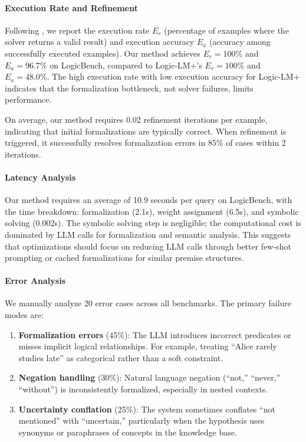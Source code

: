 \paragraph{Execution Rate and Refinement} Following \citet{pan2023logiclm}, we report the execution rate $E_r$ (percentage of examples where the solver returns a valid result) and execution accuracy $E_a$ (accuracy among successfully executed examples). Our method achieves $E_r = 100\%$ and $E_a = 96.7\%$ on LogicBench, compared to Logic-LM+'s $E_r = 100\%$ and $E_a = 48.0\%$. The high execution rate with low execution accuracy for Logic-LM+ indicates that the formalization bottleneck, not solver failures, limits performance.

On average, our method requires 0.02 refinement iterations per example, indicating that initial formalizations are typically correct. When refinement is triggered, it successfully resolves formalization errors in 85\% of cases within 2 iterations.

\paragraph{Latency Analysis} Our method requires an average of 10.9 seconds per query on LogicBench, with the time breakdown: formalization (2.1s), weight assignment (6.5s), and symbolic solving (0.002s). The symbolic solving step is negligible; the computational cost is dominated by LLM calls for formalization and semantic analysis. This suggests that optimizations should focus on reducing LLM calls through better few-shot prompting or cached formalizations for similar premise structures.

\paragraph{Error Analysis} We manually analyze 20 error cases across all benchmarks. The primary failure modes are:
\begin{enumerate}[nosep]
    \item \textbf{Formalization errors} (45\%): The LLM introduces incorrect predicates or misses implicit logical relationships. For example, treating ``Alice rarely studies late'' as categorical rather than a soft constraint.
    \item \textbf{Negation handling} (30\%): Natural language negation (``not,'' ``never,'' ``without'') is inconsistently formalized, especially in nested contexts.
    \item \textbf{Uncertainty conflation} (25\%): The system sometimes conflates ``not mentioned'' with ``uncertain,'' particularly when the hypothesis uses synonyms or paraphrases of concepts in the knowledge base.
\end{enumerate}

